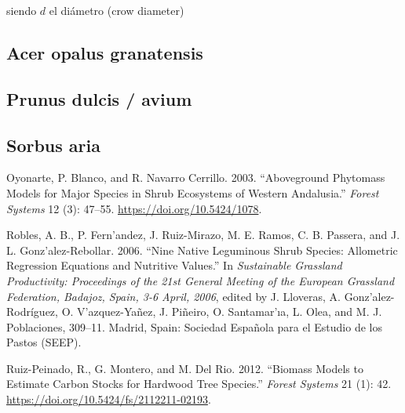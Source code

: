 \documentclass[]{article}
\begin{document}
siendo \(d\) el diámetro (crow diameter)

\hypertarget{acer-opalus-granatensis}{%
\subsection{Acer opalus granatensis}\label{acer-opalus-granatensis}}

\hypertarget{prunus-dulcis-avium}{%
\subsection{Prunus dulcis / avium}\label{prunus-dulcis-avium}}

\hypertarget{sorbus-aria}{%
\subsection*{Sorbus aria}\label{sorbus-aria}}

\hypertarget{refs}{}
\leavevmode\hypertarget{ref-OyonarteCerrillo2003AbovegroundPhytomass}{}%
Oyonarte, P. Blanco, and R. Navarro Cerrillo. 2003. ``Aboveground
Phytomass Models for Major Species in Shrub Ecosystems of Western
Andalusia.'' \emph{Forest Systems} 12 (3): 47--55.
\url{https://doi.org/10.5424/1078}.

\leavevmode\hypertarget{ref-Roblesetal2006NineNative}{}%
Robles, A. B., P. Fern\a'andez, J. Ruiz-Mirazo, M. E. Ramos, C. B.
Passera, and J. L. Gonz\a'alez-Rebollar. 2006. ``Nine Native Leguminous
Shrub Species: Allometric Regression Equations and Nutritive Values.''
In \emph{Sustainable Grassland Productivity: Proceedings of the 21st
General Meeting of the European Grassland Federation, Badajoz, Spain,
3-6 April, 2006}, edited by J. Lloveras, A. Gonz\a'alez-Rodríguez, O.
V\a'azquez-Yañez, J. Piñeiro, O. Santamar\a'ıa, L. Olea, and M. J.
Poblaciones, 309--11. Madrid, Spain: Sociedad Española para el Estudio
de los Pastos (SEEP).

\leavevmode\hypertarget{ref-RuizPeinadoetal2012BiomassModels}{}%
Ruiz-Peinado, R., G. Montero, and M. Del Rio. 2012. ``Biomass Models to
Estimate Carbon Stocks for Hardwood Tree Species.'' \emph{Forest
Systems} 21 (1): 42. \url{https://doi.org/10.5424/fs/2112211-02193}.
\end{document}
